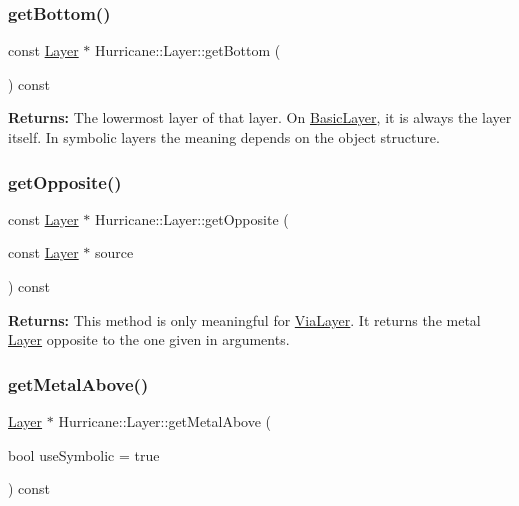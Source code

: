 \subsubsection{\texorpdfstring{get\+Bottom()}{getBottom()}}
{\footnotesize\ttfamily const \mbox{\hyperlink{classHurricane_1_1Layer}{Layer}} $\ast$ Hurricane\+::\+Layer\+::get\+Bottom (\begin{DoxyParamCaption}{ }\end{DoxyParamCaption}) const\hspace{0.3cm}{\ttfamily [virtual]}}

{\bfseries Returns\+:} The lowermost layer of that layer. On \mbox{\hyperlink{classHurricane_1_1BasicLayer}{Basic\+Layer}}, it is always the layer itself. In symbolic layers the meaning depends on the object structure. \mbox{\label{classHurricane_1_1Layer_a69e76c09a56260169c4f5c145a35a47f}} 
\subsubsection{\texorpdfstring{get\+Opposite()}{getOpposite()}}
{\footnotesize\ttfamily const \mbox{\hyperlink{classHurricane_1_1Layer}{Layer}} $\ast$ Hurricane\+::\+Layer\+::get\+Opposite (\begin{DoxyParamCaption}\item[{const \mbox{\hyperlink{classHurricane_1_1Layer}{Layer}} $\ast$}]{source }\end{DoxyParamCaption}) const\hspace{0.3cm}{\ttfamily [virtual]}}

{\bfseries Returns\+:} This method is only meaningful for \mbox{\hyperlink{classHurricane_1_1ViaLayer}{Via\+Layer}}. It returns the metal \mbox{\hyperlink{classHurricane_1_1Layer}{Layer}} opposite to the one given in arguments. \mbox{\label{classHurricane_1_1Layer_ac32eff2dc51180660fe9b4ce17cae42c}} 
\subsubsection{\texorpdfstring{get\+Metal\+Above()}{getMetalAbove()}}
{\footnotesize\ttfamily \mbox{\hyperlink{classHurricane_1_1Layer}{Layer}} $\ast$ Hurricane\+::\+Layer\+::get\+Metal\+Above (\begin{DoxyParamCaption}\item[{bool}]{use\+Symbolic = {\ttfamily true} }\end{DoxyParamCaption}) const}

